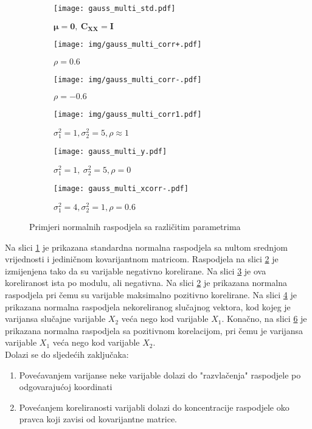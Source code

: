 \begin{figure}[H]
  \centering
	\begin{subfigure}[b]{0.28\textwidth}
		\centering
		\texttt{[image: gauss\_multi\_std.pdf]}
		\caption{$\bm\mu=\bm 0,\ \bm C_{\bm X\bm X} = \bm I$}
		\label{fig:gauss2a}
	\end{subfigure}
	\begin{subfigure}[b]{0.28\textwidth}
		\centering
    \texttt{[image: img/gauss\_multi\_corr+.pdf]}
    \caption{$\rho = 0.6$}
		\label{fig:gauss2b}
	\end{subfigure}
	\begin{subfigure}[b]{0.28\textwidth}
		\centering
    \texttt{[image: img/gauss\_multi\_corr-.pdf]}
    \caption{$\rho = -0.6$}
		\label{fig:gauss2c}
	\end{subfigure}
	\begin{subfigure}[b]{0.28\textwidth}
		\centering
    \texttt{[image: img/gauss\_multi\_corr1.pdf]}
    \caption{$\sigma_1^2=1, \sigma_2^2=5, \rho \approx 1$}
		\label{fig:gauss2e}
	\end{subfigure}
	\begin{subfigure}[b]{0.28\textwidth}
		\centering
    \texttt{[image: gauss\_multi\_y.pdf]}
    \caption{$\sigma_1^2=1,\ \sigma_2^2=5, \rho=0$}
		\label{fig:gauss2d}
	\end{subfigure}
	\begin{subfigure}[b]{0.28\textwidth}
		\centering
    \texttt{[image: gauss\_multi\_xcorr-.pdf]}
    \caption{$\sigma_1^2=4, \sigma_2^2=1, \rho=0.6$}
		\label{fig:gauss2f}
	\end{subfigure}
	\caption{Primjeri normalnih raspodjela sa različitim parametrima}
	\label{fig:gauss2}
\end{figure}

Na slici \ref{fig:gauss2a} je prikazana standardna normalna raspodjela sa nultom
srednjom vrijednosti i jediničnom kovarijantnom matricom. Raspodjela na slici
\ref{fig:gauss2b} je izmijenjena tako da su varijable negativno korelirane. Na
slici \ref{fig:gauss2c} je ova koreliranost ista po modulu, ali negativna. Na
slici \ref{fig:gauss2b} je prikazana normalna raspodjela pri čemu su varijable
maksimalno pozitivno korelirane. Na slici \ref{fig:gauss2e} je prikazana
normalna raspodjela nekoreliranog slučajnog vektora, kod kojeg je varijansa
slučajne varijable $X_2$ veća nego kod varijable $X_1$. Konačno, na slici
\ref{fig:gauss2f} je prikazana normalna raspodjela sa pozitivnom korelacijom,
pri čemu je varijansa varijable $X_1$ veća nego kod varijable $X_2$.\\

\noindent
Dolazi se do sljedećih zaključaka:
\begin{enumerate}
	\item Povećavanjem varijanse neke varijable dolazi do "razvlačenja" raspodjele
		po odgovarajućoj koordinati
	\item Povećanjem koreliranosti varijabli dolazi do koncentracije raspodjele
		oko pravca koji zavisi od kovarijantne matrice.
\end{enumerate}

